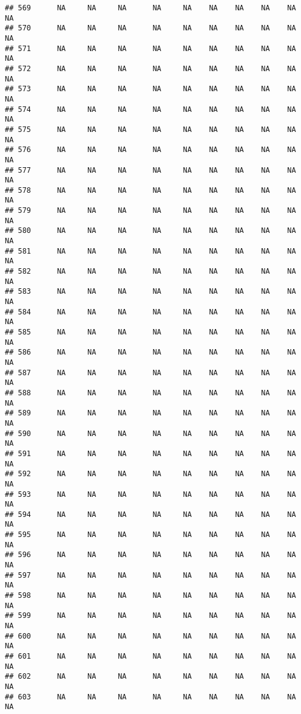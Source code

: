 \documentclass{article}\usepackage{graphicx, color}
\makeatletter
\newenvironment{kframe}{%
 \def\at@end@of@kframe{}%
 \ifinner\ifhmode%
  \def\at@end@of@kframe{\end{minipage}}%
  \begin{minipage}{\columnwidth}%
 \fi\fi%
 \def\FrameCommand##1{\hskip\@totalleftmargin \hskip-\fboxsep
 \colorbox{shadecolor}{##1}\hskip-\fboxsep
     \hskip-\linewidth \hskip-\@totalleftmargin \hskip\columnwidth}%
 \MakeFramed {\advance\hsize-\width
   \@totalleftmargin\z@ \linewidth\hsize
   \@setminipage}}%
 {\par\unskip\endMakeFramed%
 \at@end@of@kframe}
\newenvironment{knitrout}{}{} %
\makeatother
\begin{document}
\begin{knitrout}
\begin{kframe}
\begin{verbatim}
## 569      NA     NA     NA      NA     NA    NA    NA    NA    NA     NA
## 570      NA     NA     NA      NA     NA    NA    NA    NA    NA     NA
## 571      NA     NA     NA      NA     NA    NA    NA    NA    NA     NA
## 572      NA     NA     NA      NA     NA    NA    NA    NA    NA     NA
## 573      NA     NA     NA      NA     NA    NA    NA    NA    NA     NA
## 574      NA     NA     NA      NA     NA    NA    NA    NA    NA     NA
## 575      NA     NA     NA      NA     NA    NA    NA    NA    NA     NA
## 576      NA     NA     NA      NA     NA    NA    NA    NA    NA     NA
## 577      NA     NA     NA      NA     NA    NA    NA    NA    NA     NA
## 578      NA     NA     NA      NA     NA    NA    NA    NA    NA     NA
## 579      NA     NA     NA      NA     NA    NA    NA    NA    NA     NA
## 580      NA     NA     NA      NA     NA    NA    NA    NA    NA     NA
## 581      NA     NA     NA      NA     NA    NA    NA    NA    NA     NA
## 582      NA     NA     NA      NA     NA    NA    NA    NA    NA     NA
## 583      NA     NA     NA      NA     NA    NA    NA    NA    NA     NA
## 584      NA     NA     NA      NA     NA    NA    NA    NA    NA     NA
## 585      NA     NA     NA      NA     NA    NA    NA    NA    NA     NA
## 586      NA     NA     NA      NA     NA    NA    NA    NA    NA     NA
## 587      NA     NA     NA      NA     NA    NA    NA    NA    NA     NA
## 588      NA     NA     NA      NA     NA    NA    NA    NA    NA     NA
## 589      NA     NA     NA      NA     NA    NA    NA    NA    NA     NA
## 590      NA     NA     NA      NA     NA    NA    NA    NA    NA     NA
## 591      NA     NA     NA      NA     NA    NA    NA    NA    NA     NA
## 592      NA     NA     NA      NA     NA    NA    NA    NA    NA     NA
## 593      NA     NA     NA      NA     NA    NA    NA    NA    NA     NA
## 594      NA     NA     NA      NA     NA    NA    NA    NA    NA     NA
## 595      NA     NA     NA      NA     NA    NA    NA    NA    NA     NA
## 596      NA     NA     NA      NA     NA    NA    NA    NA    NA     NA
## 597      NA     NA     NA      NA     NA    NA    NA    NA    NA     NA
## 598      NA     NA     NA      NA     NA    NA    NA    NA    NA     NA
## 599      NA     NA     NA      NA     NA    NA    NA    NA    NA     NA
## 600      NA     NA     NA      NA     NA    NA    NA    NA    NA     NA
## 601      NA     NA     NA      NA     NA    NA    NA    NA    NA     NA
## 602      NA     NA     NA      NA     NA    NA    NA    NA    NA     NA
## 603      NA     NA     NA      NA     NA    NA    NA    NA    NA     NA

\end{verbatim}
\end{kframe}
\end{knitrout}
\end{document}
